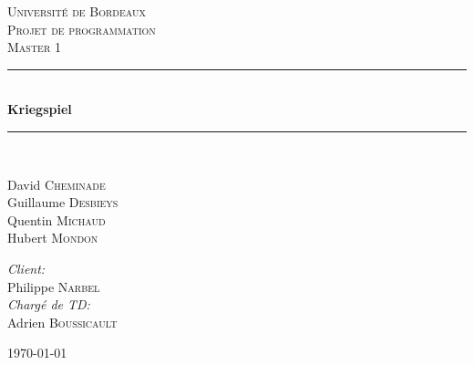 \newcommand{\HRule}{\rule{\linewidth}{0.5mm}}

\begin{titlepage}
\begin{center}

\textsc{\LARGE Université de Bordeaux}\\[1.5cm]

\textsc{\Large Projet de programmation}\\[0.5cm]

\textsc{\Large Master 1}\\[0.5cm]


\HRule \\[0.4cm]
{ \huge \bfseries Kriegspiel \\[0.4cm] }

\HRule \\[1.5cm]

\begin{minipage}{0.4\textwidth}
	\begin{flushleft} \large
		David \textsc{Cheminade} \\
		Guillaume \textsc{Desbieys} \\
		Quentin \textsc{Michaud} \\
		Hubert \textsc{Mondon}
	\end{flushleft}
\end{minipage}
\begin{minipage}{0.4\textwidth}
	\begin{flushright} \large
		\emph{Client:} \\
		Philippe \textsc{Narbel}\\
		\emph{Chargé de TD:} \\
		Adrien \textsc{Boussicault}
	\end{flushright}
\end{minipage}

\vfill

{\large \today}

\end{center}
\end{titlepage} 